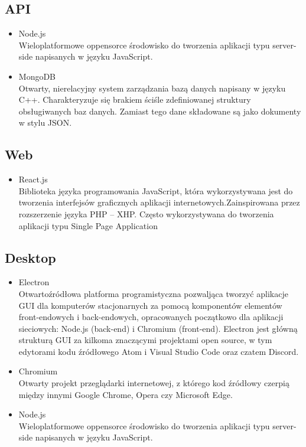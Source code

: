 \documentclass{article}
\begin{document}
    \subsection{API}
    \begin{itemize}
            \item Node.js\\
            Wieloplatformowe oppensorce środowisko do tworzenia aplikacji typu server-side napisanych w języku JavaScript.
            \item MongoDB\\
             Otwarty, nierelacyjny system zarządzania bazą danych napisany w języku C++. Charakteryzuje się brakiem ściśle zdefiniowanej struktury obsługiwanych baz danych. Zamiast tego dane składowane są jako dokumenty w stylu JSON.
             \end{itemize}
             
    \subsection{Web}
    \begin{itemize}
            \item React.js\\
            Biblioteka języka programowania JavaScript, która wykorzystywana jest do tworzenia interfejsów graficznych aplikacji internetowych.Zainspirowana przez rozszerzenie języka PHP – XHP. Często wykorzystywana do tworzenia aplikacji typu Single Page Application
             \end{itemize}
        
    \subsection{Desktop}
    \begin{itemize}
            \item Electron\\
            Otwartoźródłowa platforma programistyczna pozwaljąca tworzyć aplikacje GUI dla komputerów stacjonarnych za pomocą komponentów elementów front-endowych i back-endowych, opracowanych początkowo dla aplikacji sieciowych: Node.js (back-end) i Chromium (front-end). Electron jest główną strukturą GUI za kilkoma znaczącymi projektami open source, w tym edytorami kodu źródłowego Atom i Visual Studio Code oraz czatem Discord.
            \item Chromium\\
            Otwarty projekt przeglądarki internetowej, z którego kod źródłowy czerpią między innymi Google Chrome, Opera czy Microsoft Edge.
            \item Node.js\\
            Wieloplatformowe oppensorce środowisko do tworzenia aplikacji typu server-side napisanych w języku JavaScript.
             \end{itemize}
             
\end{document}
